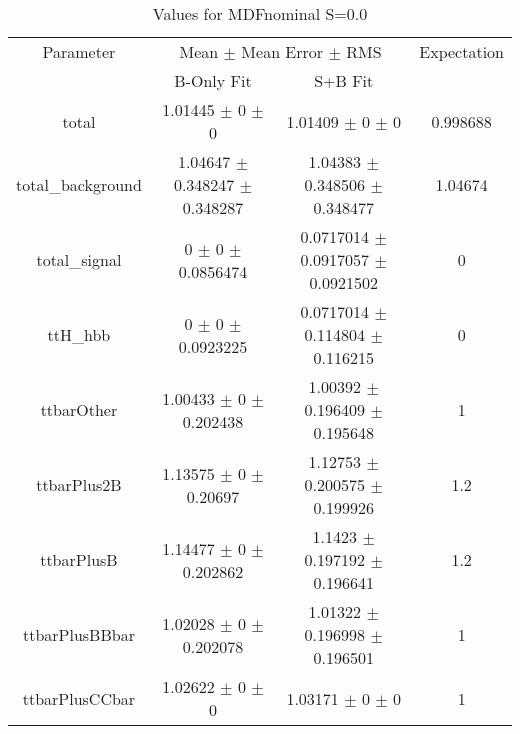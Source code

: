 \begin{table}
\centering
\caption{Values for MDFnominal S=0.0}
\begin{tabular}{cccc}
\toprule
Parameter & \multicolumn{2}{c}{Mean $\pm$ Mean Error $\pm$ RMS} & Expectation\\
 & B-Only Fit & S+B Fit & \\
\midrule
total & \num{1.01445} $\pm$ \num{0} $\pm$ \num{0} & \num{1.01409} $\pm$ \num{0} $\pm$ \num{0} & \num{0.998688}\\
total\_background & \num{1.04647} $\pm$ \num{0.348247} $\pm$ \num{0.348287} & \num{1.04383} $\pm$ \num{0.348506} $\pm$ \num{0.348477} & \num{1.04674}\\
total\_signal & \num{0} $\pm$ \num{0} $\pm$ \num{0.0856474} & \num{0.0717014} $\pm$ \num{0.0917057} $\pm$ \num{0.0921502} & \num{0}\\
ttH\_hbb & \num{0} $\pm$ \num{0} $\pm$ \num{0.0923225} & \num{0.0717014} $\pm$ \num{0.114804} $\pm$ \num{0.116215} & \num{0}\\
ttbarOther & \num{1.00433} $\pm$ \num{0} $\pm$ \num{0.202438} & \num{1.00392} $\pm$ \num{0.196409} $\pm$ \num{0.195648} & \num{1}\\
ttbarPlus2B & \num{1.13575} $\pm$ \num{0} $\pm$ \num{0.20697} & \num{1.12753} $\pm$ \num{0.200575} $\pm$ \num{0.199926} & \num{1.2}\\
ttbarPlusB & \num{1.14477} $\pm$ \num{0} $\pm$ \num{0.202862} & \num{1.1423} $\pm$ \num{0.197192} $\pm$ \num{0.196641} & \num{1.2}\\
ttbarPlusBBbar & \num{1.02028} $\pm$ \num{0} $\pm$ \num{0.202078} & \num{1.01322} $\pm$ \num{0.196998} $\pm$ \num{0.196501} & \num{1}\\
ttbarPlusCCbar & \num{1.02622} $\pm$ \num{0} $\pm$ \num{0} & \num{1.03171} $\pm$ \num{0} $\pm$ \num{0} & \num{1}\\
\bottomrule
\end{tabular}
\end{table}